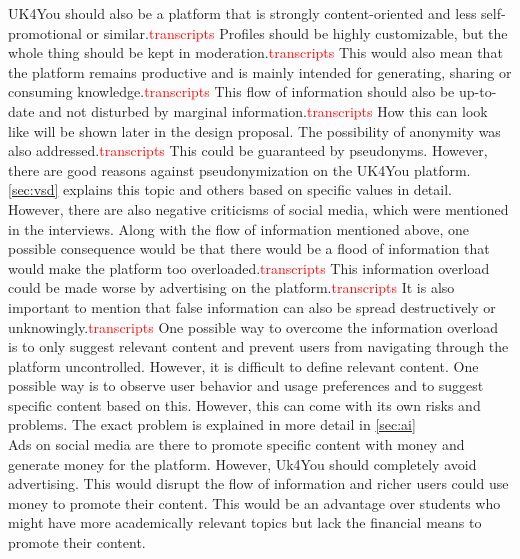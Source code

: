UK4You should also be a platform that is strongly content-oriented and less self-promotional or similar.\textcolor{red}{transcripts}
Profiles should be highly customizable, but the whole thing should be kept in moderation.\textcolor{red}{transcripts}
This would also mean that the platform remains productive and is mainly intended for generating, sharing or consuming knowledge.\textcolor{red}{transcripts}
This flow of information should also be up-to-date and not disturbed by marginal information.\textcolor{red}{transcripts}
How this can look like will be shown later in the design proposal.
The possibility of anonymity was also addressed.\textcolor{red}{transcripts}
This could be guaranteed by pseudonyms.
However, there are good reasons against pseudonymization on the UK4You platform.
\autoref{sec:vsd} explains this topic and others based on specific values in detail.\\

However, there are also negative criticisms of social media, which were mentioned in the interviews.
Along with the flow of information mentioned above, one possible consequence would be that there would be a flood of information that would make the platform too overloaded.\textcolor{red}{transcripts}
This information overload could be made worse by advertising on the platform.\textcolor{red}{transcripts}
It is also important to mention that false information can also be spread destructively or unknowingly.\textcolor{red}{transcripts}
One possible way to overcome the information overload is to only suggest relevant content and prevent users from navigating through the platform uncontrolled.
However, it is difficult to define relevant content.
One possible way is to observe user behavior and usage preferences and to suggest specific content based on this.
However, this can come with its own risks and problems.
The exact problem is explained in more detail in \autoref{sec:ai}\\

Ads on social media are there to promote specific content with money and generate money for the platform.
However, Uk4You should completely avoid advertising.
This would disrupt the flow of information and richer users could use money to promote their content.
This would be an advantage over students who might have more academically relevant topics but lack the financial means to promote their content.\\

